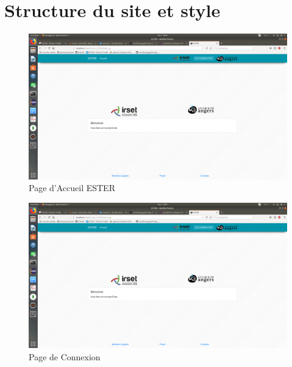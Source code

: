 \section{Structure du site et style}

\begin{figure}[H]
    \begin{center}
	\includegraphics[scale=0.2,trim=4cm 0cm 4cm 5.3cm, clip=true]{img/ESTER}
    \end{center}
    \caption{Page d'Accueil ESTER}
\end{figure}

\begin{figure}[H]
    \begin{center}
	\includegraphics[scale=0.2,trim=4cm 0cm 4cm 5.3cm, clip=true]{img/ESTER}
    \end{center}
    \caption{Page de Connexion}
\end{figure}